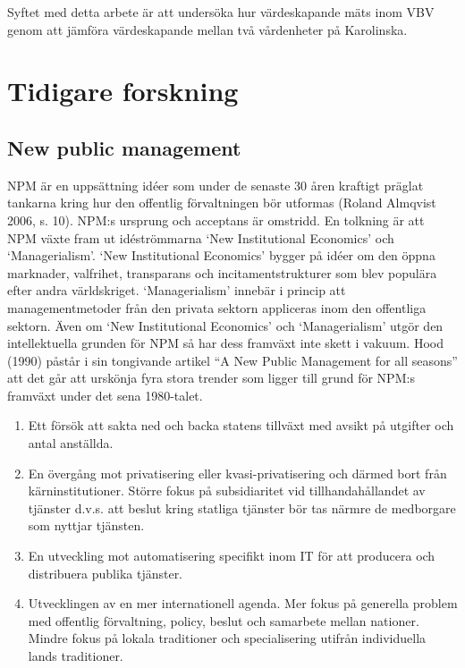 Syftet med detta arbete är att undersöka hur värdeskapande mäts inom VBV genom att jämföra värdeskapande mellan två vårdenheter på Karolinska.

\section{Tidigare forskning}

\subsection{New public management}

NPM är en uppsättning idéer som under de senaste 30 åren kraftigt präglat tankarna kring hur den offentlig förvaltningen bör utformas (Roland Almqvist 2006, s. 10). NPM:s ursprung och acceptans är omstridd. En tolkning är att NPM växte fram ut idéströmmarna ‘New Institutional Economics’ och ‘Managerialism’. ‘New Institutional Economics’ bygger på idéer om den öppna marknader, valfrihet, transparans och incitamentstrukturer som blev populära efter andra världskriget. ‘Managerialism’ innebär i princip att managementmetoder från den privata sektorn appliceras inom den offentliga sektorn. Även om ‘New Institutional Economics’ och ‘Managerialism’ utgör den intellektuella grunden för NPM så har dess framväxt inte skett i vakuum. Hood (1990) påstår i sin tongivande artikel “A New Public Management for all seasons” att det går att urskönja fyra stora trender som ligger till grund för NPM:s framväxt under det sena 1980-talet.

\begin{enumerate}
  \item Ett försök att sakta ned och backa statens tillväxt med avsikt på utgifter och antal anställda.
  \item En övergång mot privatisering eller kvasi-privatisering och därmed bort från kärninstitutioner. Större fokus på subsidiaritet vid tillhandahållandet av tjänster d.v.s. att beslut kring statliga tjänster bör tas närmre de medborgare som nyttjar tjänsten.
  \item En utveckling mot automatisering specifikt inom IT för att producera och distribuera publika tjänster.
  \item Utvecklingen av en mer internationell agenda. Mer fokus på generella problem med offentlig förvaltning, policy, beslut och samarbete mellan nationer. Mindre fokus på lokala traditioner och specialisering utifrån individuella lands traditioner.
\end{enumerate}

